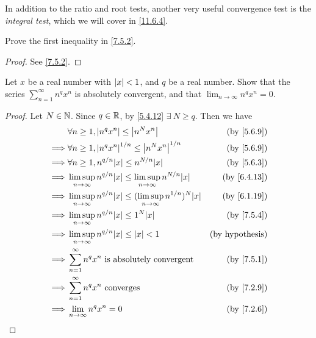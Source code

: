 \begin{rmk}\label{7.5.5}
  In addition to the ratio and root tests, another very useful convergence test is the \emph{integral test}, which we will cover in \cref{11.6.4}.
\end{rmk}

\exercisesection

\begin{ex}\label{ex:7.5.1}
  Prove the first inequality in \cref{7.5.2}.
\end{ex}

\begin{proof}
  See \cref{7.5.2}.
\end{proof}

\begin{ex}\label{ex:7.5.2}
  Let \(x\) be a real number with \(\left\lvert x\right\rvert < 1\), and \(q\) be a real number.
  Show that the series \(\sum_{n = 1}^\infty n^q x^n\) is absolutely convergent, and that \(\lim_{n \to \infty} n^q x^n = 0\).
\end{ex}

\begin{proof}
  Let \(N \in \mathbb{N}\).
  Since \(q \in \mathbb{R}\), by \cref{5.4.12} \(\exists\ N \geq q\).
  Then we have
  \begin{align*}
             & \forall n \geq 1, \abs{n^q x^n} \leq \abs{n^N x^n}                                         & \text{(by \cref{5.6.9})}  \\
    \implies & \forall n \geq 1, \abs{n^q x^n}^{1 / n} \leq \abs{n^N x^n}^{1 / n}                         & \text{(by \cref{5.6.9})}  \\
    \implies & \forall n \geq 1, n^{q / n} \abs{x} \leq n^{N / n} \abs{x}                                 & \text{(by \cref{5.6.3})}  \\
    \implies & \limsup_{n \to \infty} n^{q / n} \abs{x} \leq \limsup_{n \to \infty} n^{N / n} \abs{x}     & \text{(by \cref{6.4.13})} \\
    \implies & \limsup_{n \to \infty} n^{q / n} \abs{x} \leq (\limsup_{n \to \infty} n^{1 / n})^N \abs{x} & \text{(by \cref{6.1.19})} \\
    \implies & \limsup_{n \to \infty} n^{q / n} \abs{x} \leq 1^N \abs{x}                                  & \text{(by \cref{7.5.4})}  \\
    \implies & \limsup_{n \to \infty} n^{q / n} \abs{x} \leq \abs{x} < 1                                  & \text{(by hypothesis)}    \\
    \implies & \sum_{n = 1}^\infty n^q x^n \text{ is absolutely convergent}                               & \text{(by \cref{7.5.1})}  \\
    \implies & \sum_{n = 1}^\infty n^q x^n \text{ converges}                                              & \text{(by \cref{7.2.9})}  \\
    \implies & \lim_{n \to \infty} n^q x^n = 0                                                            & \text{(by \cref{7.2.6})}
  \end{align*}
\end{proof}

